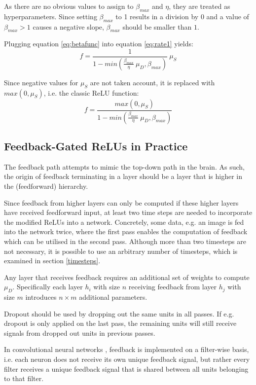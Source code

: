 \documentclass{article}
\begin{document}
As there are no obvious values to assign to $\beta_{max}$ and $\eta$, they are treated as hyperparameters. Since setting $\beta_{max}$ to 1 results in a division by $0$ and a value of $\beta_{max} > 1$ causes a negative slope, $\beta_{max}$ should be smaller than $1$. 

Plugging equation \ref{eq:betafunc} into equation \ref{eq:rate1} yields: 
\begin{equation}
	f = \frac{1}{1 - min(\frac{\beta_{max}}{\eta} \ \mu_D, \beta_{max})} \ \mu_S 
\end{equation}

Since negative values for $\mu_S$ are not taken account, it is replaced with $max(0, \mu_S)$, i.e. the classic ReLU function: 
\begin{equation}
\label{eq:fgrelu}
		f = \frac{max(0, \mu_S)}{1 - min(\frac{\beta_{max}}{\eta} \ \mu_D, \beta_{max})} 
\end{equation}

\subsection{Feedback-Gated ReLUs in Practice}
The feedback path attempts to mimic the top-down path in the brain. As such, the origin of feedback terminating in a layer should be a layer that is higher in the (feedforward) hierarchy. 

Since feedback from higher layers can only be computed if these higher layers have received feedforward input, at least two time steps are needed to incorporate the modified ReLUs into a network. Concretely, some data, e.g. an image is fed into the network twice, where the first pass enables the computation of feedback which can be utilised in the second pass. 
	Although more than two timesteps are not necessary, it is possible to use an arbitrary number of timesteps, which is examined in section \ref{timesteps}.
	
Any layer that receives feedback requires an additional set of weights to compute $\mu_D$. Specifically each layer $h_i$ with size $n$ receiving feedback from layer $h_j$ with size $m$ introduces $n \times m$ additional parameters.  
	
Dropout \cite{srivastava2014dropout} should be used by dropping out the same units in all passes.  
If e.g. dropout is only applied on the last pass, the remaining units will still receive signals from dropped out units in previous passes.

In convolutional neural networks \cite{lecun1989generalization}, feedback is implemented on a filter-wise basis, i.e. each neuron does not receive its own unique feedback signal, but rather every filter receives a unique feedback signal that is shared between all units belonging to that filter. 
\end{document}
